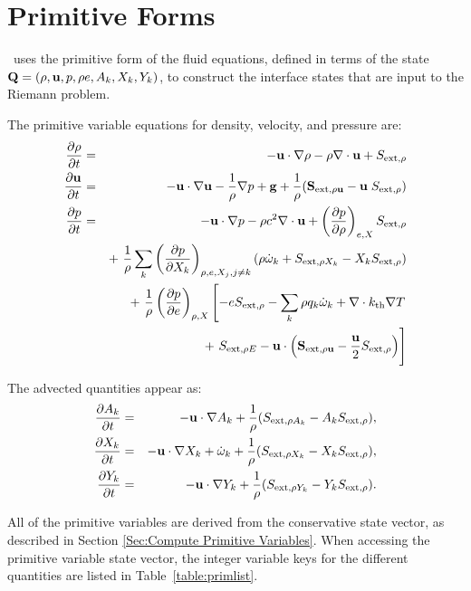 \section{Primitive Forms}
\castro\ uses the primitive form of the fluid equations, defined in terms of
the state ${\bf Q} = (\rho, {\bf u}, p, \rho e, A_k, X_k, Y_k)$, to construct the
interface states that are input to the Riemann problem.

The primitive variable equations for density, velocity, and pressure are:
\begin{eqnarray}
  \frac{\partial\rho}{\partial t} &=& -\ub\cdot\nabla\rho - \rho\nabla\cdot\ub + S_{{\rm ext},\rho} \\
%
  \frac{\partial\ub}{\partial t} &=& -\ub\cdot\nabla\ub - \frac{1}{\rho}\nabla p + \gb + 
\frac{1}{\rho} (\Sb_{{\rm ext},\rho\ub} - \ub \; S_{{\rm ext},\rho}) \\
\frac{\partial p}{\partial t} &=& -\ub\cdot\nabla p - \rho c^2\nabla\cdot\ub +
\left(\frac{\partial p}{\partial \rho}\right)_{e,X}S_{{\rm ext},\rho}\nonumber\\
&&+\  \frac{1}{\rho}\sum_k\left(\frac{\partial p}{\partial X_k}\right)_{\rho,e,X_j,j\neq k}\left(\rho\dot\omega_k + S_{{\rm ext},\rho X_k} - X_kS_{{\rm ext},\rho}\right)\nonumber\\
&& +\  \frac{1}{\rho}\left(\frac{\partial p}{\partial e}\right)_{\rho,X}\left[-eS_{{\rm ext},\rho} - \sum_k\rho q_k\dot\omega_k + \nabla\cdot\kth\nabla T \right.\nonumber\\
&& \quad\qquad\qquad\qquad+\ S_{{\rm ext},\rho E} - \ub\cdot\left(\Sb_{{\rm ext},\rho\ub} - \frac{\ub}{2}S_{{\rm ext},\rho}\right)\Biggr] 
\end{eqnarray}

The advected quantities appear as:
\begin{eqnarray}
\frac{\partial A_k}{\partial t} &=& -{\bf u}\cdot\nabla A_k + \frac{1}{\rho}
                                     ( S_{{\rm ext},\rho A_k} - A_k S_{{\rm ext},\rho} ), \\
\frac{\partial X_k}{\partial t} &=& -{\bf u}\cdot\nabla X_k + \dot\omega_k + \frac{1}{\rho}
                                     ( S_{{\rm ext},\rho X_k}  - X_k S_{{\rm ext},\rho} ), \\
\frac{\partial Y_k}{\partial t} &=& -{\bf u}\cdot\nabla Y_k + \frac{1}{\rho} 
                                     ( S_{{\rm ext},\rho Y_k}  - Y_k S_{{\rm ext},\rho} ).
\end{eqnarray}

All of the primitive variables are derived from the conservative state
vector, as described in Section \ref{Sec:Compute Primitive Variables}.
When accessing the primitive variable state vector, the integer variable
keys for the different quantities are listed in Table~\ref{table:primlist}.

